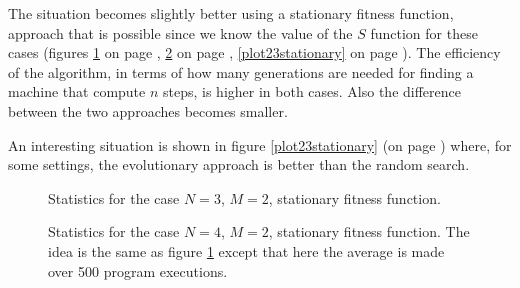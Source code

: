 \documentclass{report}
\begin{document}
The situation becomes slightly better using a stationary fitness function, approach that is possible since we know the value of the $S$ function for these cases (figures \ref{plot32stationary} on page \pageref{plot32stationary}, \ref{plot42stationary} on page \pageref{plot42stationary}, \ref{plot23stationary} on page \pageref{plot23stationary}). The efficiency of the algorithm, in terms of how many generations are needed for finding a machine that compute $n$ steps, is higher in both cases. Also the difference between the two approaches becomes smaller.

An interesting situation is shown in figure \ref{plot23stationary} (on page \pageref{plot23stationary}) where, for some settings, the evolutionary approach is better than the random search.

\begin{figure}[h]
\centering
{}
\caption[]{Statistics for the case $N=3$, $M=2$, stationary fitness function.}
\label{plot32stationary}
\end{figure}


\begin{figure}[h]
\centering
{}
\caption[]{Statistics for the case $N=4$, $M=2$, stationary fitness function. The idea is the same as figure \ref{plot32stationary} except that here the average is made over 500 program executions.}
\label{plot42stationary}
\end{figure}
\end{document}
